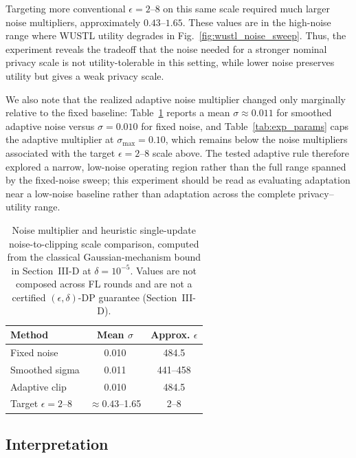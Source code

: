 \documentclass[conference]{IEEEtran}
\begin{document}
Targeting more conventional \(\epsilon=2\)--8 on this same scale required much
larger noise multipliers, approximately \(0.43\)--\(1.65\). These values are in
the high-noise range where WUSTL utility degrades in
Fig.~\ref{fig:wustl_noise_sweep}. Thus, the experiment reveals the tradeoff that
the noise needed for a stronger nominal privacy scale is not utility-tolerable
in this setting, while lower noise preserves utility but gives a weak privacy
scale.

We also note that the realized adaptive noise multiplier changed only
marginally relative to the fixed baseline: Table~\ref{tab:epsilon_sigma_summary}
reports a mean \(\sigma \approx 0.011\) for smoothed adaptive noise versus
\(\sigma = 0.010\) for fixed noise, and Table~\ref{tab:exp_params} caps the
adaptive multiplier at \(\sigma_{\max}=0.10\), which remains below the noise
multipliers associated with the target \(\epsilon=2\)--8 scale above. The tested
adaptive rule therefore explored a narrow, low-noise operating region rather
than the full range spanned by the fixed-noise sweep; this experiment should be
read as evaluating adaptation near a low-noise baseline rather than adaptation
across the complete privacy--utility range.

\begin{table}[!t]
\centering
\caption{Noise multiplier and heuristic single-update noise-to-clipping scale
comparison, computed from the classical Gaussian-mechanism bound in
Section~III-D at \(\delta=10^{-5}\). Values are not composed across FL rounds
and are not a certified \((\epsilon,\delta)\)-DP guarantee (Section~III-D).}
\label{tab:epsilon_sigma_summary}
\renewcommand{\arraystretch}{1.15}
\begin{tabular}{lcc}
\hline
\textbf{Method} & \textbf{Mean \(\sigma\)} & \textbf{Approx. \(\epsilon\)} \\
\hline
Fixed noise & 0.010 & 484.5 \\
Smoothed sigma & 0.011 & 441--458 \\
Adaptive clip & 0.010 & 484.5 \\
Target \(\epsilon=2\)--8 & \(\approx 0.43\)--1.65 & 2--8 \\
\hline
\end{tabular}
\end{table}

\subsection{Interpretation}
\end{document}
